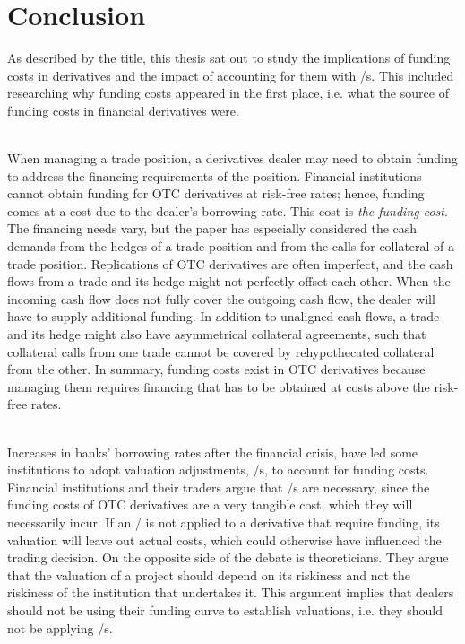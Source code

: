 \documentclass[main.tex]{subfiles}
\begin{document}
    \part{Conclusion}

    As described by the title, this thesis sat out to study the implications
    of funding costs in derivatives and the impact of accounting for them with \FVA/s.
    This included researching why funding costs appeared in the first place,
    i.e. what the source of funding costs in financial derivatives were.
    
    \textbf{\researchQuestionFundingCosts}\\
    When managing a trade position, a derivatives dealer may need to obtain funding 
    to address the financing requirements of the position.
    Financial institutions cannot obtain funding for OTC derivatives at risk-free rates;
    hence, funding comes at a cost due to the dealer's borrowing rate.
    This cost is \textit{the funding cost}.
    The financing needs vary, but the paper has especially considered
    the cash demands from the hedges of a trade position
    and from the calls for collateral of a trade position.
    Replications of OTC derivatives are often imperfect,
    and the cash flows from a trade and its hedge might not perfectly offset each other.
    When the incoming cash flow does not fully cover the outgoing cash flow,
    the dealer will have to supply additional funding.
    In addition to unaligned cash flows, 
    a trade and its hedge might also have asymmetrical collateral agreements,
    such that collateral calls from one trade cannot be covered by rehypothecated collateral from the other.
    In summary, funding costs exist in OTC derivatives
    because managing them requires financing 
    that has to be obtained at costs above the risk-free rates.

    \textbf{\researchQuestionFvaDebate}\\
    Increases in banks' borrowing rates after the financial crisis,
    have led some institutions to adopt valuation adjustments, \FVA/s, to account for funding costs.
    Financial institutions and their traders argue that \FVA/s are necessary,
    since the funding costs of OTC derivatives are a very tangible cost,
    which they will necessarily incur.
    If an \FVA/ is not applied to a derivative that require funding,
    its valuation will leave out actual costs, 
    which could otherwise have influenced the trading decision.
    On the opposite side of the debate is theoreticians.
    They argue that the valuation of a project should depend on its riskiness
    and not the riskiness of the institution that undertakes it.
    This argument implies that dealers should not be using their funding curve to establish 
    valuations, i.e. they should not be applying \FVA/s.
\end{document}
